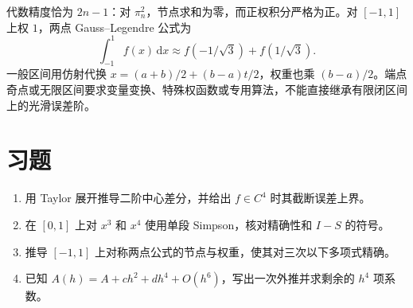 代数精度恰为 $2n-1$：对 $\pi_n^2$，节点求和为零，而正权积分严格为正。对 $[-1,1]$ 上权 $1$，两点 Gauss--Legendre 公式为
\[
 \int_{-1}^1f(x)\,\mathrm dx\approx f(-1/\sqrt3)+f(1/\sqrt3).
\]
一般区间用仿射代换 $x=(a+b)/2+(b-a)t/2$，权重也乘 $(b-a)/2$。端点奇点或无限区间要求变量变换、特殊权函数或专用算法，不能直接继承有限闭区间上的光滑误差阶。

\section{习题}
\begin{enumerate}[label=\arabic*.]
\item\label{exr:na-quad-difference} 用 Taylor 展开推导二阶中心差分，并给出 $f\in C^4$ 时其截断误差上界。
\item\label{exr:na-quad-simpson} 在 $[0,1]$ 上对 $x^3$ 和 $x^4$ 使用单段 Simpson，核对精确性和 $I-S$ 的符号。
\item\label{exr:na-quad-gauss} 推导 $[-1,1]$ 上对称两点公式的节点与权重，使其对三次以下多项式精确。
\item\label{exr:na-quad-richardson} 已知 $A(h)=A+ch^2+dh^4+O(h^6)$，写出一次外推并求剩余的 $h^4$ 项系数。
\end{enumerate}

